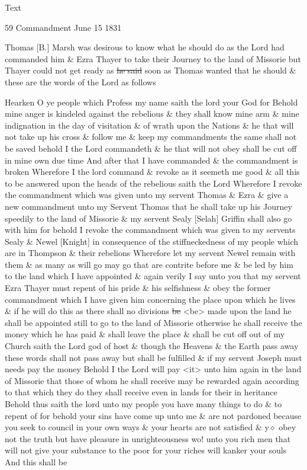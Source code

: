 			\begin{description}
				\item[Text]
			\end{description}
			
				\begin{tightcenter}
				59 Commandment June 15 1831
				\end{tightcenter}
				
				Thomas [B.] Marsh was desirous to know what he should do as the Lord had commanded him \& Ezra Thayer to take their Journey to the land of Missorie but Thayer could not get ready as \sout{he said} soon as Thomas wanted that he should \& these are the words of the Lord as follows
				
				Hearken O ye people which Profess my name saith the lord your God for Behold mine anger is kindeled against the rebelious \& they shall know mine arm \& mine indignation in the day of visitation \& of wrath upon the Nations \& he that will not take up his cross \& follow me \& keep my commandments the same shall not be saved behold I the Lord commandeth \& he that will not obey shall be cut off in mine own due time And after that I have commanded \& the commandment is broken Wherefore I the lord command \& revoke as it seemeth me good \& all this to be answered upon the heads of the rebelious saith the Lord Wherefore I revoke the commandment which was given unto my servent Thomas \& Ezra \& give a new commandment unto my Servent Thomas that he shall take up his Journey speedily to the land of Missorie \& my servent Sealy [Selah] Griffin shall also go with him for behold I revoke the commandment which was given to my servents Sealy \& Newel [Knight] in consequence of the stiffneckedness of my people which are in Thompson \& their rebelions Wherefore let my servent Newel remain with them \& as many as will go may go that are contrite before me \& be led by him to the land which I have appointed \& again verily I say unto you that my servent Ezra Thayer must repent of his pride \& his selfishness \& obey the former commandment which I have given him concerning the place upon which he lives \& if he will do this as there shall no divisions \sout{be} <be> made upon the land he shall be appointed still to go to the land of Missorie otherwise he shall receive the money which he has paid \& shall leave the place \& shall be cut off out of my Church saith the Lord god of host \& though the Heavens \& the Earth pass away these words shall not pass away but shall be fulfilled \& if my servent Joseph must needs pay the money Behold I the Lord will pay <it> unto him again in the land of Missorie that those of whom he shall receive may be rewarded again according to that which they do they shall receive even in lands for their in heritance Behold thus saith the lord unto my people you have many things to do \& to repent of for behold your sins have come up unto me \& are not pardoned because you seek to council in your own ways \& your hearts are not satisfied \& y$\diamond$ obey not the truth but have pleasure in unrighteousness wo! unto you rich men that will not give your substance to the poor for your riches will kanker your souls And this shall be 